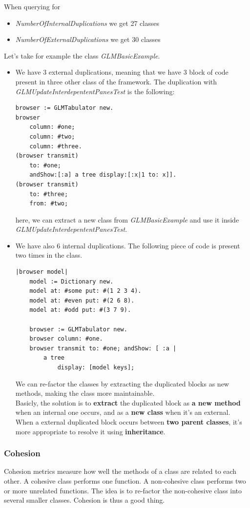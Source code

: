 \documentclass[11pt,a4paper]{article}
\begin{document}
When querying for
\begin{itemize}
\item \textit{NumberOfInternalDuplications} we get 27 classes
\item \textit{NumberOfExternalDuplications} we get 30 classes
\end{itemize}
Let's take for example the class \textit{GLMBasicExample}.
\begin{itemize}
\item We have 3 external duplications, meaning that we have 3 block of code present in three other class of the framework. The duplication with \textit{GLMUpdateInterdepententPanesTest} is the following:
\begin{lstlisting}
browser := GLMTabulator new.
browser
	column: #one;
	column: #two;
	column: #three.
(browser transmit)
	to: #one;
	andShow:[:a] a tree display:[:x|1 to: x]].
(browser transmit)
	to: #three;
	from: #two;
\end{lstlisting}
here, we can extract a new class from \textit{GLMBasicExample} and use it inside \textit{GLMUpdateInterdepententPanesTest}.

\item We have also 6 internal duplications. The following piece of code is present two times in the class.
\begin{lstlisting}
|browser model|
	model := Dictionary new.
	model at: #some put: #(1 2 3 4).
	model at: #even put: #(2 6 8).
	model at: #odd put: #(3 7 9).
	
	browser := GLMTabulator new.
	browser column: #one.
	browser transmit to: #one; andShow: [ :a |
		a tree
			display: [model keys];  
\end{lstlisting}

We can re-factor the classes by extracting the duplicated blocks as new methods, making the class more maintainable.\\

Basicly, the solution is to \textbf{extract} the duplicated block as \textbf{a new method} when  an internal one occurs, and as a \textbf{new class} when it's an external. When a external duplicated block occurs between \textbf{two parent classes}, it's more appropriate to resolve it using \textbf{inheritance}. 
\end{itemize}	
\subsubsection{Cohesion}
Cohesion metrics measure how well the methods of a class are related to each other. A cohesive class performs one function. A non-cohesive class performs two or more unrelated functions. The idea is to re-factor the non-cohesive class into several smaller classes. Cohesion is thus a good thing.
\end{document}

